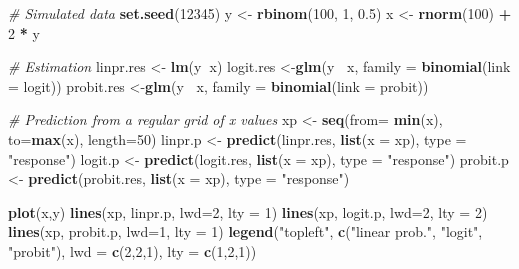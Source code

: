 \documentclass[]{book}
\newenvironment{Shaded}{\begin{snugshade}}{\end{snugshade}}
\newcommand{\CommentTok}[1]{\textcolor[rgb]{0.56,0.35,0.01}{\textit{#1}}}
\newcommand{\DataTypeTok}[1]{\textcolor[rgb]{0.13,0.29,0.53}{#1}}
\newcommand{\DecValTok}[1]{\textcolor[rgb]{0.00,0.00,0.81}{#1}}
\newcommand{\FloatTok}[1]{\textcolor[rgb]{0.00,0.00,0.81}{#1}}
\newcommand{\KeywordTok}[1]{\textcolor[rgb]{0.13,0.29,0.53}{\textbf{#1}}}
\newcommand{\NormalTok}[1]{#1}
\newcommand{\OperatorTok}[1]{\textcolor[rgb]{0.81,0.36,0.00}{\textbf{#1}}}
\newcommand{\StringTok}[1]{\textcolor[rgb]{0.31,0.60,0.02}{#1}}
\begin{document}
\begin{Shaded}
\begin{Highlighting}[]
\CommentTok{# Simulated data}
\KeywordTok{set.seed}\NormalTok{(}\DecValTok{12345}\NormalTok{)}
\NormalTok{y <-}\StringTok{ }\KeywordTok{rbinom}\NormalTok{(}\DecValTok{100}\NormalTok{, }\DecValTok{1}\NormalTok{, }\FloatTok{0.5}\NormalTok{)}
\NormalTok{x <-}\StringTok{ }\KeywordTok{rnorm}\NormalTok{(}\DecValTok{100}\NormalTok{) }\OperatorTok{+}\StringTok{ }\DecValTok{2} \OperatorTok{*}\StringTok{ }\NormalTok{y}

\CommentTok{# Estimation }
\NormalTok{linpr.res <-}\StringTok{ }\KeywordTok{lm}\NormalTok{(y}\OperatorTok{~}\NormalTok{x)}
\NormalTok{logit.res <-}\KeywordTok{glm}\NormalTok{(y }\OperatorTok{~}\NormalTok{x, }\DataTypeTok{family =} \KeywordTok{binomial}\NormalTok{(}\DataTypeTok{link =}\NormalTok{ logit))}
\NormalTok{probit.res <-}\KeywordTok{glm}\NormalTok{(y }\OperatorTok{~}\NormalTok{x, }\DataTypeTok{family =} \KeywordTok{binomial}\NormalTok{(}\DataTypeTok{link =}\NormalTok{ probit))}

\CommentTok{# Prediction from a regular grid of x values}
\NormalTok{xp <-}\StringTok{ }\KeywordTok{seq}\NormalTok{(}\DataTypeTok{from=} \KeywordTok{min}\NormalTok{(x), }\DataTypeTok{to=}\KeywordTok{max}\NormalTok{(x), }\DataTypeTok{length=}\DecValTok{50}\NormalTok{)}
\NormalTok{linpr.p <-}\StringTok{ }\KeywordTok{predict}\NormalTok{(linpr.res, }\KeywordTok{list}\NormalTok{(}\DataTypeTok{x =}\NormalTok{ xp), }\DataTypeTok{type =} \StringTok{"response"}\NormalTok{)}
\NormalTok{logit.p <-}\StringTok{ }\KeywordTok{predict}\NormalTok{(logit.res, }\KeywordTok{list}\NormalTok{(}\DataTypeTok{x =}\NormalTok{ xp), }\DataTypeTok{type =} \StringTok{"response"}\NormalTok{)}
\NormalTok{probit.p <-}\StringTok{ }\KeywordTok{predict}\NormalTok{(probit.res, }\KeywordTok{list}\NormalTok{(}\DataTypeTok{x =}\NormalTok{ xp), }\DataTypeTok{type =} \StringTok{"response"}\NormalTok{)}
\end{Highlighting}
\end{Shaded}

\begin{Shaded}
\begin{Highlighting}[]
\KeywordTok{plot}\NormalTok{(x,y)}
\KeywordTok{lines}\NormalTok{(xp, linpr.p, }\DataTypeTok{lwd=}\DecValTok{2}\NormalTok{, }\DataTypeTok{lty =} \DecValTok{1}\NormalTok{)}
\KeywordTok{lines}\NormalTok{(xp, logit.p, }\DataTypeTok{lwd=}\DecValTok{2}\NormalTok{, }\DataTypeTok{lty =} \DecValTok{2}\NormalTok{)}
\KeywordTok{lines}\NormalTok{(xp, probit.p, }\DataTypeTok{lwd=}\DecValTok{1}\NormalTok{, }\DataTypeTok{lty =} \DecValTok{1}\NormalTok{)}
\KeywordTok{legend}\NormalTok{(}\StringTok{"topleft"}\NormalTok{, }
       \KeywordTok{c}\NormalTok{(}\StringTok{"linear prob."}\NormalTok{, }\StringTok{"logit"}\NormalTok{, }\StringTok{"probit"}\NormalTok{), }
       \DataTypeTok{lwd =} \KeywordTok{c}\NormalTok{(}\DecValTok{2}\NormalTok{,}\DecValTok{2}\NormalTok{,}\DecValTok{1}\NormalTok{), }\DataTypeTok{lty =} \KeywordTok{c}\NormalTok{(}\DecValTok{1}\NormalTok{,}\DecValTok{2}\NormalTok{,}\DecValTok{1}\NormalTok{))}
\end{Highlighting}
\end{Shaded}
\end{document}

